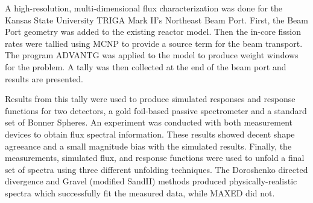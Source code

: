 
\pagestyle{empty}
\setlength{\baselineskip}{0.8cm}



A high-resolution, multi-dimensional flux characterization was done for the Kansas State University TRIGA Mark II's Northeast Beam Port.
First, the Beam Port geometry was added to the existing reactor model.
Then the in-core fission rates were tallied using MCNP to provide a source term for the beam transport.
The program ADVANTG was applied to the model to produce weight windows for the problem.
A tally was then collected at the end of the beam port and results are presented.

Results from this tally were used to produce simulated responses and response functions for two detectors, a gold foil-based passive spectrometer and a standard set of Bonner Spheres.
An experiment was conducted with both measurement devices to obtain flux spectral information.
These results showed decent shape agreeance and a small magnitude bias with the simulated results.
Finally, the measurements, simulated flux, and response functions were used to unfold a final set of spectra using three different unfolding techniques.
The Doroshenko directed divergence and Gravel (modified SandII) methods produced physically-realistic spectra which successfully fit the measured data, while MAXED did not.

